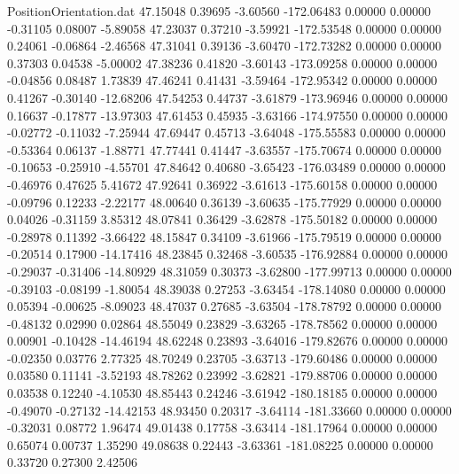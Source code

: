 \begin{filecontents}{PositionOrientation.dat}
  47.15048    0.39695   -3.60560  -172.06483    0.00000    0.00000   -0.31105    0.08007   -5.89058
  47.23037    0.37210   -3.59921  -172.53548    0.00000    0.00000    0.24061   -0.06864   -2.46568
  47.31041    0.39136   -3.60470  -172.73282    0.00000    0.00000    0.37303    0.04538   -5.00002
  47.38236    0.41820   -3.60143  -173.09258    0.00000    0.00000   -0.04856    0.08487    1.73839
  47.46241    0.41431   -3.59464  -172.95342    0.00000    0.00000    0.41267   -0.30140  -12.68206
  47.54253    0.44737   -3.61879  -173.96946    0.00000    0.00000    0.16637   -0.17877  -13.97303
  47.61453    0.45935   -3.63166  -174.97550    0.00000    0.00000   -0.02772   -0.11032   -7.25944
  47.69447    0.45713   -3.64048  -175.55583    0.00000    0.00000   -0.53364    0.06137   -1.88771
  47.77441    0.41447   -3.63557  -175.70674    0.00000    0.00000   -0.10653   -0.25910   -4.55701
  47.84642    0.40680   -3.65423  -176.03489    0.00000    0.00000   -0.46976    0.47625    5.41672
  47.92641    0.36922   -3.61613  -175.60158    0.00000    0.00000   -0.09796    0.12233   -2.22177
  48.00640    0.36139   -3.60635  -175.77929    0.00000    0.00000    0.04026   -0.31159    3.85312
  48.07841    0.36429   -3.62878  -175.50182    0.00000    0.00000   -0.28978    0.11392   -3.66422
  48.15847    0.34109   -3.61966  -175.79519    0.00000    0.00000   -0.20514    0.17900  -14.17416
  48.23845    0.32468   -3.60535  -176.92884    0.00000    0.00000   -0.29037   -0.31406  -14.80929
  48.31059    0.30373   -3.62800  -177.99713    0.00000    0.00000   -0.39103   -0.08199   -1.80054
  48.39038    0.27253   -3.63454  -178.14080    0.00000    0.00000    0.05394   -0.00625   -8.09023
  48.47037    0.27685   -3.63504  -178.78792    0.00000    0.00000   -0.48132    0.02990    0.02864
  48.55049    0.23829   -3.63265  -178.78562    0.00000    0.00000    0.00901   -0.10428  -14.46194
  48.62248    0.23893   -3.64016  -179.82676    0.00000    0.00000   -0.02350    0.03776    2.77325
  48.70249    0.23705   -3.63713  -179.60486    0.00000    0.00000    0.03580    0.11141   -3.52193
  48.78262    0.23992   -3.62821  -179.88706    0.00000    0.00000    0.03538    0.12240   -4.10530
  48.85443    0.24246   -3.61942  -180.18185    0.00000    0.00000   -0.49070   -0.27132  -14.42153
  48.93450    0.20317   -3.64114  -181.33660    0.00000    0.00000   -0.32031    0.08772    1.96474
  49.01438    0.17758   -3.63414  -181.17964    0.00000    0.00000    0.65074    0.00737    1.35290
  49.08638    0.22443   -3.63361  -181.08225    0.00000    0.00000    0.33720    0.27300    2.42506

\end{filecontents}
